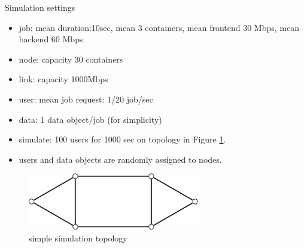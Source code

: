 
Simulation settings
\begin{itemize}
\item		job: mean duration:10sec, mean 3 containers,
  mean frontend 30 Mbps, mean backend 60 Mbps
\item		node: capacity 30 containers
\item		link: capacity 1000Mbps
\item		user: mean job request: 1/20 job/sec
\item		data: 1 data object/job (for simplicity)
\item		simulate: 100 users for 1000 sec on topology in Figure \ref{fig:topology-simple}.
\item		users and data objects are randomly assigned to nodes.
\end{itemize}

\begin{figure}[htb]
\begin{center}
\includegraphics[width=7.5cm,clip]{topology-simple.pdf}
\vspace{-2.0ex}
\caption{simple simulation topology}
\label{fig:topology-simple}
\end{center}
\end{figure}
